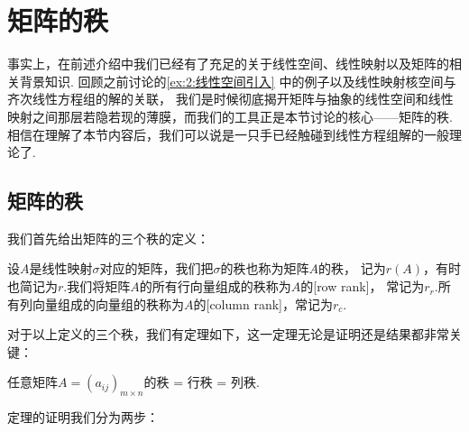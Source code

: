 \chapter{矩阵的秩}

事实上，在前述介绍中我们已经有了充足的关于线性空间、线性映射以及矩阵的相关背景知识.
回顾之前讨论的\autoref{ex:2:线性空间引入} 中的例子以及线性映射核空间与齐次线性方程组的解的关联，
我们是时候彻底揭开矩阵与抽象的线性空间和线性映射之间那层若隐若现的薄膜，而我们的工具正是本节讨论的核心——矩阵的秩.
相信在理解了本节内容后，我们可以说是一只手已经触碰到线性方程组解的一般理论了.

\section{矩阵的秩}
我们首先给出矩阵的三个秩的定义：
\begin{definition}
    设$A$是线性映射$\sigma$对应的矩阵，我们把$\sigma$的秩也称为矩阵$A$的秩，
    记为$r(A)$，有时也简记为$r$.我们将矩阵$A$的所有行向量组成的秩称为$A$的[row rank]，
    常记为$r_r$.所有列向量组成的向量组的秩称为$A$的[column rank]，常记为$r_c$.
\end{definition}
对于以上定义的三个秩，我们有定理如下，这一定理无论是证明还是结果都非常关键：
\begin{theorem}
    任意矩阵$A=(a_{ij})_{m\times n}$的秩 = 行秩 = 列秩.
\end{theorem}
定理的证明我们分为两步：
